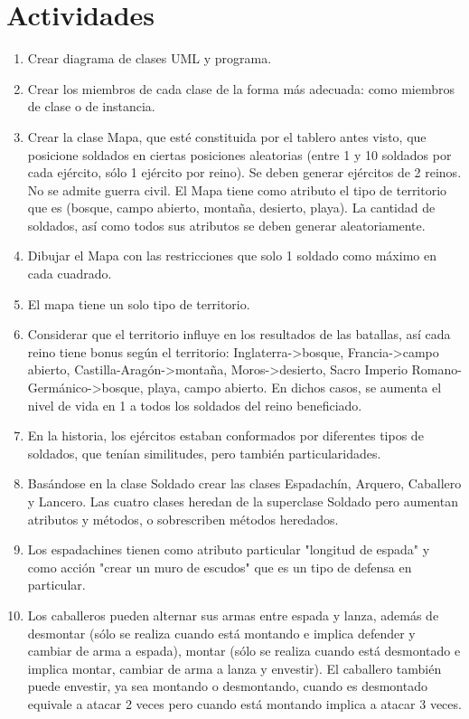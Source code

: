 	\section{Actividades}
\begin{enumerate}
    \item Crear diagrama de clases UML y programa.
    \item Crear los miembros de cada clase de la forma más adecuada: como miembros de clase o de instancia.
    \item Crear la clase Mapa, que esté constituida por el tablero antes visto, que posicione soldados en ciertas posiciones aleatorias (entre 1 y 10 soldados por cada ejército, sólo 1 ejército por reino). Se deben generar ejércitos de 2 reinos. No se admite guerra civil. El Mapa tiene como atributo el tipo de territorio que es (bosque, campo abierto, montaña, desierto, playa). La cantidad de soldados, así como todos sus atributos se deben generar aleatoriamente.
    \item Dibujar el Mapa con las restricciones que solo 1 soldado como máximo en cada cuadrado.
    \item El mapa tiene un solo tipo de territorio.
    \item Considerar que el territorio influye en los resultados de las batallas, así cada reino tiene bonus según el territorio: Inglaterra->bosque, Francia->campo abierto, Castilla-Aragón->montaña, Moros->desierto, Sacro Imperio Romano-Germánico->bosque, playa, campo abierto. En dichos casos, se aumenta el nivel de vida en 1 a todos los soldados del reino beneficiado.
    \item En la historia, los ejércitos estaban conformados por diferentes tipos de soldados, que tenían similitudes, pero también particularidades.
    \item Basándose en la clase Soldado crear las clases Espadachín, Arquero, Caballero y Lancero. Las cuatro clases heredan de la superclase Soldado pero aumentan atributos y métodos, o sobrescriben métodos heredados.
    \item Los espadachines tienen como atributo particular "longitud de espada" y como acción "crear un muro de escudos" que es un tipo de defensa en particular.
    \item Los caballeros pueden alternar sus armas entre espada y lanza, además de desmontar (sólo se realiza cuando está montando e implica defender y cambiar de arma a espada), montar (sólo se realiza cuando está desmontado e implica montar, cambiar de arma a lanza y envestir). El caballero también puede envestir, ya sea montando o desmontando, cuando es desmontado equivale a atacar 2 veces pero cuando está montando implica a atacar 3 veces.

\end{enumerate}
